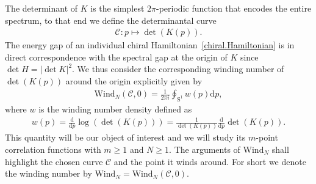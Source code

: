 \documentclass[pdflatex,sn-mathphys-num]{sn-jnl}
\theoremstyle{thmstyleone}
\numberwithin{equation}{section}
\begin{document}
The determinant of $K$ is the simplest $2\pi$-periodic function that encodes the entire spectrum, to that end we define the determinantal curve
\begin{align}
    \mathscr{C}:p\mapsto \det\left(K\left(p\right)\right).
\end{align}
The energy gap of an individual chiral Hamiltonian~\eqref{chiral.Hamiltonian} is in direct correspondence with the spectral gap at the origin of $K$ since $\det H=|\det K|^2$.
We thus consider the corresponding winding number of $\det\left(K\left(p\right)\right)$ around the origin explicitly given by
\begin{align}\label{windingnumber1}
    \mathrm{Wind}_{N}\left(\mathscr{C},0\right)=\frac{1}{2\pi i}\oint_{\mathrm{S}^{1}}^{}w\left( p \right)\mathrm{d}p,
\end{align}
where $w$ is the winding number density defined as
\begin{align}\label{wdnumberdensity1}
    w\left( p \right)=\frac{\mathrm{d}}{\mathrm{d}p}\log\left( \det\left( K\left( p \right) \right) \right)=\frac{1}{\det\left( K\left( p \right)\right)}\frac{\mathrm{d}}{\mathrm{d}p} \det\left( K\left( p \right) \right). 
\end{align}
This quantity will be our object of interest and we will study its $m$-point correlation functions with $m\geq 1$ and $N\geq 1$.
The arguments of $\mathrm{Wind}_{N}$ shall highlight the chosen curve $\mathscr{C}$ and the point it winds around. For short we denote the winding number by $\mathrm{Wind}_{N}=\mathrm{Wind}_{N}\left(\mathscr{C},0\right)$.
\end{document}
